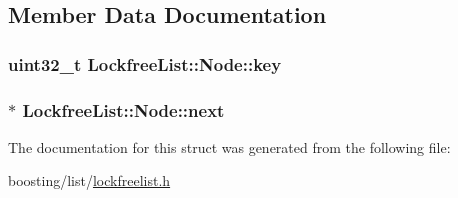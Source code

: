 \subsection{Member Data Documentation}
\hypertarget{structLockfreeList_1_1Node_a6830d823a3fad2bf88fe1b1b7e25786c}{
\subsubsection[{key}]{\setlength{\rightskip}{0pt plus 5cm}uint32\-\_\-t Lockfree\-List\-::\-Node\-::key}}\label{structLockfreeList_1_1Node_a6830d823a3fad2bf88fe1b1b7e25786c}
\hypertarget{structLockfreeList_1_1Node_a89b9c0742a414a580760301965734d0f}{
\subsubsection[{next}]{$\ast$ Lockfree\-List\-::\-Node\-::next}}\label{structLockfreeList_1_1Node_a89b9c0742a414a580760301965734d0f}


The documentation for this struct was generated from the following file\-:\begin{DoxyCompactItemize}
\item 
boosting/list/\hyperlink{lockfreelist_8h}{lockfreelist.\-h}\end{DoxyCompactItemize}

